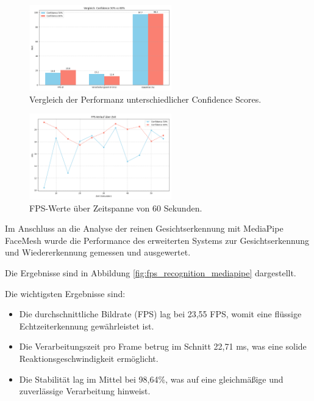 \begin{figure}[ht]
    \centering
    \includegraphics[width=0.55\textwidth]{data/Vergleich_Confidence_50_vs_80.png}
    \caption{Vergleich der Performanz unterschiedlicher Confidence Scores.}
    \label{fig:vergleich_confidence}
\end{figure}


\begin{figure}[ht]
    \centering
    \includegraphics[width=0.55\textwidth]{data/FPS_ueber_Zeit.png}
    \caption{FPS-Werte über Zeitspanne von 60 Sekunden.}
    \label{fig:fps_ueber_zeit}
\end{figure}


Im Anschluss an die Analyse der reinen Gesichtserkennung mit MediaPipe FaceMesh wurde die Performance des erweiterten Systems zur Gesichtserkennung und Wiedererkennung gemessen und ausgewertet.

Die Ergebnisse sind in Abbildung \ref{fig:fps_recognition_mediapipe} dargestellt.

Die wichtigsten Ergebnisse sind:
\begin{itemize}
    \item Die durchschnittliche Bildrate (FPS) lag bei 23,55 FPS, womit eine flüssige Echtzeiterkennung gewährleistet ist.
    \item Die Verarbeitungszeit pro Frame betrug im Schnitt 22,71 ms, was eine solide Reaktionsgeschwindigkeit ermöglicht.
    \item Die Stabilität lag im Mittel bei 98,64\%, was auf eine gleichmäßige und zuverlässige Verarbeitung hinweist.
\end{itemize}

